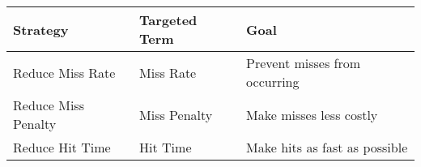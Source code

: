 \begin{table}[!htp]
    \centering
    \begin{tabular}{@{} l l l @{}}
        \toprule
        Strategy & Targeted Term & Goal \\
        \midrule
        Reduce Miss Rate    & Miss Rate     & Prevent misses from occurring \\ [.3em]
        Reduce Miss Penalty & Miss Penalty  & Make misses less costly       \\ [.3em]
        Reduce Hit Time     & Hit Time      & Make hits as fast as possible \\
        \bottomrule
    \end{tabular}
\end{table}